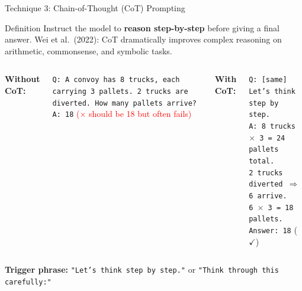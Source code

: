 \documentclass{beamer}
\begin{document}
\begin{frame}{Technique 3: Chain-of-Thought (CoT) Prompting}
    \begin{block}{Definition}
        Instruct the model to \textbf{reason step-by-step} before giving a final answer.
        Wei et al.\ (2022): CoT dramatically improves complex reasoning on arithmetic,
        commonsense, and symbolic tasks.
    \end{block}

    \vspace{0.2cm}
    \begin{columns}
        \textbf{Without CoT:}
        \begin{tcolorbox}[colback=backcolour, colframe=red!40]
            \scriptsize
            \texttt{Q: A convoy has 8 trucks, each carrying 3 pallets. 2 trucks are diverted.
            How many pallets arrive?}\vspace{2pt}\\
            \texttt{A: 18}  \hfill \textcolor{red}{($\times$ should be 18 but often fails)}
        \end{tcolorbox}

        \textbf{With CoT:}
        \begin{tcolorbox}[colback=backcolour, colframe=green!40]
            \scriptsize
            \texttt{Q: [same] Let's think step by step.}\vspace{2pt}\\
            \texttt{A: 8 trucks $\times$ 3 = 24 pallets total.}\\
            \texttt{2 trucks diverted $\Rightarrow$ 6 arrive.}\\
            \texttt{6 $\times$ 3 = 18 pallets.}\\
            \texttt{Answer: 18} \hfill \textcolor{green!60!black}{($\checkmark$)}
        \end{tcolorbox}
    \end{columns}

    \vspace{0.2cm}
    \small
    \textbf{Trigger phrase:} \texttt{"Let's think step by step."} or \texttt{"Think through this carefully:"}
\end{frame}
\end{document}
